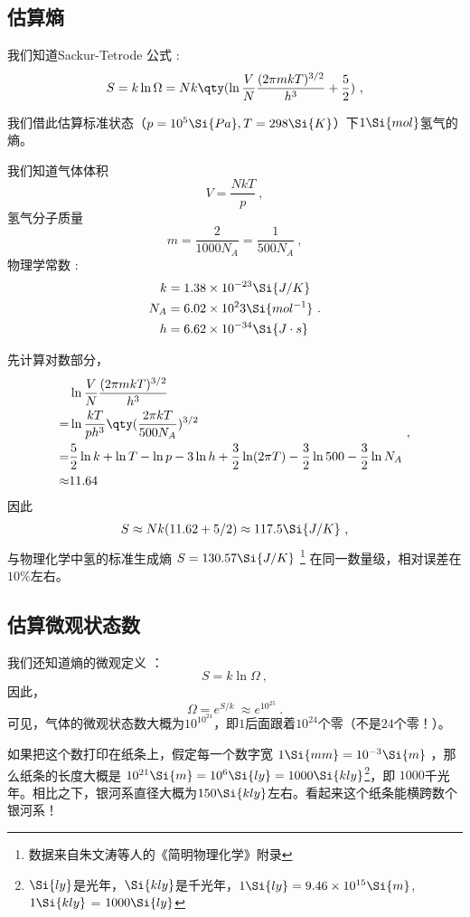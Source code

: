 


\subsection{估算熵}
我们知道Sackur-Tetrode 公式 :
\begin{equation}
S = k\ln \Omega  = Nk \qty(\ln \frac{V}{N} \frac{(2\pi mkT)^{3/2}}{h^3} + \frac52)~,
\end{equation}

我们借此估算标准状态（$p=10^5 \Si{Pa}, T=298\Si{K}$）下$1 \Si{mol}$氢气的熵。

我们知道气体体积 
$$V=\frac{NkT}{p}~,$$
氢气分子质量 
$$m = \frac{2}{1000 N_A} = \frac{1}{500 N_A}~,$$
物理学常数 : 
$$
\begin{aligned}
k &= 1.38 \times 10^{-23}\Si{J/K}\\
N_A &= 6.02 \times 10^23 \Si{mol^{-1}}\\
h &= 6.62\times10^{-34} \Si{J\cdot s}
\end{aligned}
~.$$

先计算对数部分，
$$
\begin{aligned}
 & \ln \frac{V}{N} \frac{(2\pi mkT)^{3/2}}{h^3} \\
 = & \ln \frac{kT}{p h^3} \qty(\frac{2\pi kT}{500 N_A})^{3/2}\\
 = & \frac{5}{2} \ln k + \ln T - \ln p - 3 \ln h + \frac{3}{2} \ln (2 \pi T) - \frac{3}{2} \ln 500 - \frac{3}{2} \ln N_A \\
 \approx & 11.64\\
\end{aligned}~,
$$
因此
$$
\begin{aligned}
S \approx Nk (11.62+5/2) \approx 117.5 \Si{J/K}
\end{aligned}~,
$$
与物理化学中氢的标准生成熵 $S = 130.57 \Si{J/K}$ \footnote{数据来自朱文涛等人的《简明物理化学》附录} 在同一数量级，相对误差在$10\%$左右。

\subsection{估算微观状态数}
我们还知道熵的微观定义  ：
\begin{equation}
S = k \ln \Omega~,
\end{equation}
因此，
$$
\Omega = e^{S/k}~ \approx e^{10^{25}} ~.
$$
可见，气体的微观状态数大概为$10^{10^{24}}$，即$1$后面跟着$10^{24}$个零（不是$24$个零！）。

如果把这个数打印在纸条上，假定每一个数字宽 $1 \Si{mm} = 10^{-3} \Si{m}$ ，那么纸条的长度大概是 $10^{21} \Si{m} = 10^6 \Si{ly} = 1000 \Si{kly}$\footnote{$\Si{ly}$是光年，$\Si{kly}$是千光年，$1 \Si{ly} = 9.46\times10^{15} \Si{m}$, $1 \Si{kly}$ = $1000 \Si{ly}$}，即 $1000$千光年。相比之下，银河系直径大概为$150 \Si{kly}$左右。看起来这个纸条能横跨数个银河系！

